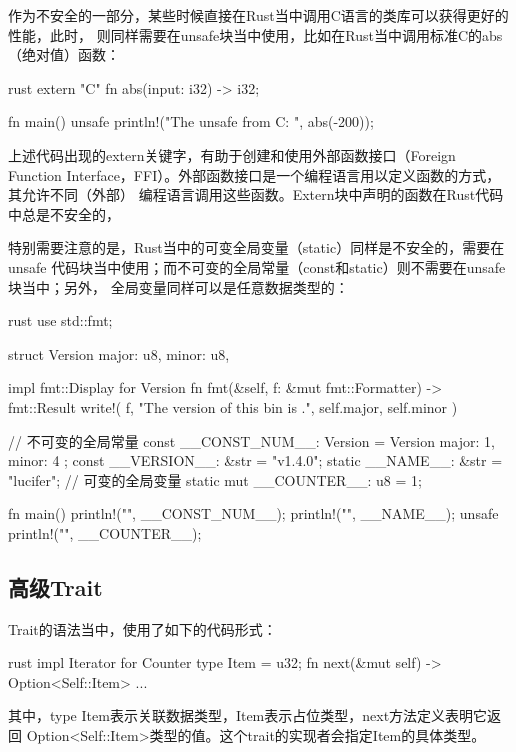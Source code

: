 作为不安全的一部分，某些时候直接在Rust当中调用C语言的类库可以获得更好的性能，此时，
则同样需要在unsafe块当中使用，比如在Rust当中调用标准C的abs（绝对值）函数：
\begin{code-block}{rust}
extern "C" {
    fn abs(input: i32) -> i32;
}

fn main() {
    unsafe {
        println!("The unsafe from C: {}", abs(-200));
    }
}
\end{code-block}
上述代码出现的extern关键字，有助于创建和使用外部函数接口（Foreign Function
Interface，FFI）。外部函数接口是一个编程语言用以定义函数的方式，其允许不同（外部）
编程语言调用这些函数。Extern块中声明的函数在Rust代码中总是不安全的，

特别需要注意的是，Rust当中的可变全局变量（static）同样是不安全的，需要在unsafe
代码块当中使用；而不可变的全局常量（const和static）则不需要在unsafe块当中；另外，
全局变量同样可以是任意数据类型的：
\begin{code-block}{rust}
use std::fmt;

struct Version {
    major: u8,
    minor: u8,
}

impl fmt::Display for Version {
    fn fmt(&self, f: &mut fmt::Formatter) -> fmt::Result {
        write!(
            f,
            "The version of this bin is {}.{}",
            self.major, self.minor
        )
    }
}

// 不可变的全局常量
const __CONST_NUM__: Version = Version { major: 1, minor: 4 };
const __VERSION__: &str = "v1.4.0";
static __NAME__: &str = "lucifer";
// 可变的全局变量
static mut __COUNTER__: u8 = 1;

fn main() {
    println!("{}", __CONST_NUM__);
    println!("{}", __NAME__);
    unsafe {
        println!("{}", __COUNTER__);
    }
}
\end{code-block}

\subsection{高级Trait}
Trait的语法当中，使用了如下的代码形式：
\begin{code-block}{rust}
impl Iterator for Counter {
    type Item = u32;
    fn next(&mut self) -> Option<Self::Item> {
        ...
    }
}
\end{code-block}
其中，type Item表示关联数据类型，Item表示占位类型，next方法定义表明它返回
Option<Self::Item>类型的值。这个trait的实现者会指定Item的具体类型。


